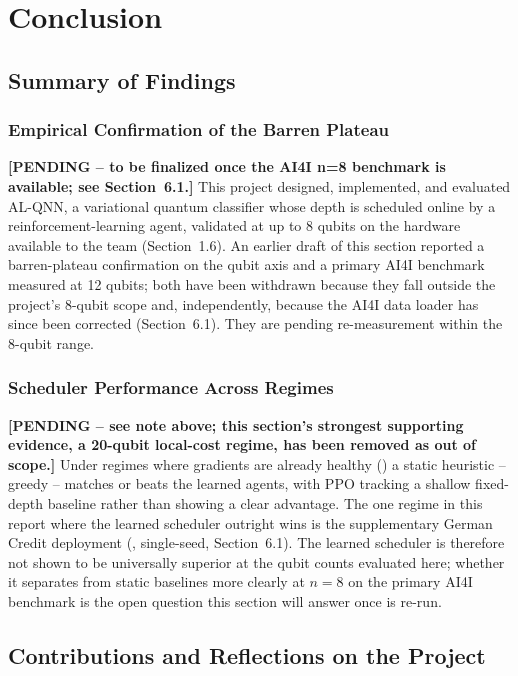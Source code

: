 \section{Conclusion}
\subsection{Summary of Findings}

\subsubsection{Empirical Confirmation of the Barren Plateau}
\textbf{[PENDING -- to be finalized once the AI4I n=8 benchmark is available; see Section~6.1.]} This project designed, implemented, and evaluated AL-QNN, a variational quantum classifier whose depth is scheduled online by a reinforcement-learning agent, validated at up to 8 qubits on the hardware available to the team (Section~1.6). An earlier draft of this section reported a barren-plateau confirmation on the qubit axis and a primary AI4I benchmark measured at 12 qubits; both have been withdrawn because they fall outside the project's 8-qubit scope and, independently, because the AI4I data loader has since been corrected (Section~6.1). They are pending re-measurement within the 8-qubit range.

\subsubsection{Scheduler Performance Across Regimes}
\textbf{[PENDING -- see note above; this section's strongest supporting evidence, a 20-qubit local-cost regime, has been removed as out of scope.]} Under regimes where gradients are already healthy () a static heuristic -- greedy -- matches or beats the learned agents, with PPO tracking a shallow fixed-depth baseline rather than showing a clear advantage. The one regime in this report where the learned scheduler outright wins is the supplementary German Credit deployment (, single-seed, Section~6.1). The learned scheduler is therefore not shown to be universally superior at the qubit counts evaluated here; whether it separates from static baselines more clearly at $n=8$ on the primary AI4I benchmark is the open question this section will answer once  is re-run.

\subsection{Contributions and Reflections on the Project}

